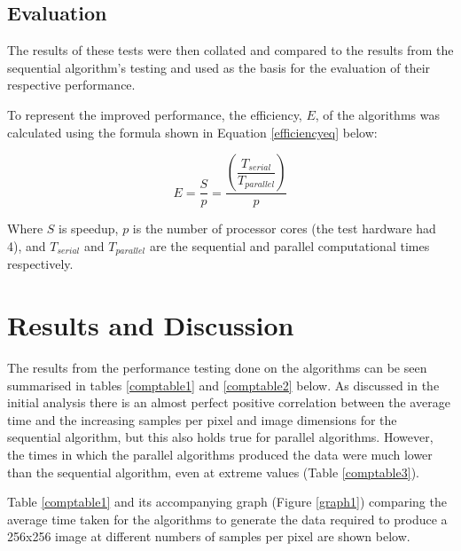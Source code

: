 \documentclass[12pt,journal,transmag]{IEEEtran}
\begin{document}
	\subsection{Evaluation}
	The results of these tests were then collated and compared to the results from the sequential algorithm's testing and used as the basis for the evaluation of	their respective performance.
	
	To represent the improved performance, the efficiency, $E$, of the algorithms was calculated using the formula shown in Equation \ref{efficiencyeq} below:
	
	\begin{equation} \label{efficiencyeq} 
	E = \dfrac{S}{p} = \dfrac{(\dfrac{T_{serial}}{T_{parallel}})}{p}
	\end{equation}
	
	Where $S$ is speedup, $p$ is the number of processor cores (the test hardware had 4), and $T_{serial}$ and $T_{parallel}$ are the sequential and parallel computational times respectively.
	
	\section{Results and Discussion}
	The results from the performance testing done on the algorithms can be seen summarised in tables \ref{comptable1} and \ref{comptable2} below. As discussed in the initial analysis there is an almost perfect positive correlation between the average time and the increasing samples per pixel and image dimensions for the sequential algorithm, but this also holds true for parallel algorithms. However, the times in which the parallel algorithms produced the data were much lower than the sequential algorithm, even at extreme values (Table \ref{comptable3}).
	
	Table \ref{comptable1} and its accompanying graph (Figure \ref{graph1}) comparing the average time taken for the algorithms to generate the data required to produce a 256x256 image at different numbers of samples per pixel are shown below.
	
\end{document}
